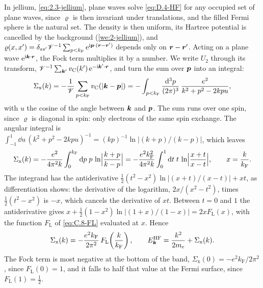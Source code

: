 In jellium, \cref{eq:2.3-jellium}, plane waves solve \cref{eq:D.4-HF} for any occupied set of plane waves, since $\varrho$ is then invariant under translations, and the filled Fermi sphere is the natural set. The density is then uniform, its Hartree potential is cancelled by the background (\cref{we:2-jellium}), and $\varrho(x, x') = \delta_{ss'}\mathscr{V}^{-1}\sum_{p < k_{\mathrm{F}}}\mathrm{e}^{\mathrm{i}\bm{p}\cdot(\bm{r} - \bm{r}')}$ depends only on $\bm{r} - \bm{r}'$. Acting on a plane wave $\mathrm{e}^{\mathrm{i}\bm{k}\cdot\bm{r}}$, the Fock term multiplies it by a number. We write $U_2$ through its transform, $\mathscr{V}^{-1}\sum_{\bm{k}'}v_{\mathrm{C}}(k')\,\mathrm{e}^{-\mathrm{i}\bm{k}'\cdot\bm{r}}$, and turn the sum over $\bm{p}$ into an integral:
\begin{equation*}
  \Sigma_{\mathrm{x}}(k) = -\frac{1}{\mathscr{V}}\sum_{p < k_{\mathrm{F}}}v_{\mathrm{C}}(|\bm{k} - \bm{p}|)
  = -\int_{p < k_{\mathrm{F}}}\frac{\mathrm{d}^3p}{(2\pi)^3}\,\frac{e^2}{k^2 + p^2 - 2kpu} ,
\end{equation*}
with $u$ the cosine of the angle between $\bm{k}$ and $\bm{p}$. The sum runs over one spin, since $\varrho$ is diagonal in spin: only electrons of the same spin exchange. The angular integral is $\int_{-1}^1\dd u\,(k^2 + p^2 - 2kpu)^{-1} = (kp)^{-1}\ln|(k + p)/(k - p)|$, which leaves
\begin{equation*}
  \Sigma_{\mathrm{x}}(k) = -\frac{e^2}{4\pi^2k}\int_0^{k_{\mathrm{F}}}\mathrm{d} p\;p\,\ln\Bigl|\frac{k + p}{k - p}\Bigr|
  = -\frac{e^2k_{\mathrm{F}}^2}{4\pi^2k}\int_0^1\mathrm{d} t\;t\,\ln\Bigl|\frac{x + t}{x - t}\Bigr| , \qquad x = \frac{k}{k_{\mathrm{F}}} .
\end{equation*}
The integrand has the antiderivative $\tfrac12(t^2 - x^2)\ln|(x + t)/(x - t)| + xt$, as differentiation shows: the derivative of the logarithm, $2x/(x^2 - t^2)$, times $\tfrac12(t^2 - x^2)$ is $-x$, which cancels the derivative of $xt$. Between $t = 0$ and $1$ the antiderivative gives $x + \tfrac12(1 - x^2)\ln|(1 + x)/(1 - x)| = 2xF_{\mathrm{L}}(x)$, with the function $F_{\mathrm{L}}$ of \cref{eq:C.8-FL} evaluated at $x$. Hence
\begin{equation}
  \Sigma_{\mathrm{x}}(k) = -\frac{e^2k_{\mathrm{F}}}{2\pi^2}\,F_{\mathrm{L}}\!\left(\frac{k}{k_{\mathrm{F}}}\right), \qquad
  E^{\mathrm{HF}}_{\bm{k}} = \frac{k^2}{2m_e} + \Sigma_{\mathrm{x}}(k) .
  \label{eq:D.4-gas}
\end{equation}
The Fock term is most negative at the bottom of the band, $\Sigma_{\mathrm{x}}(0) = -e^2k_{\mathrm{F}}/2\pi^2$, since $F_{\mathrm{L}}(0) = 1$, and it falls to half that value at the Fermi surface, since $F_{\mathrm{L}}(1) = \tfrac12$.

